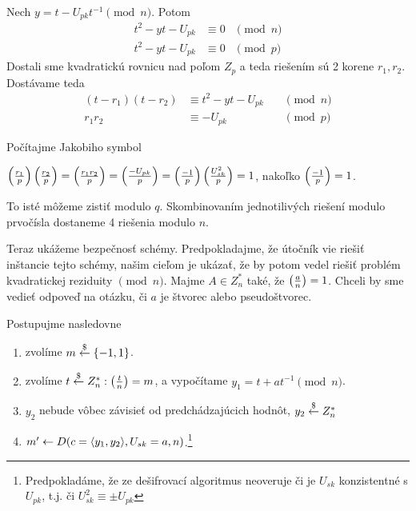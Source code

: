 Nech $y = t - U_{pk} t^{-1} \pmod{n}$.
Potom
\begin{align*}
    t^2 - y t - U_{pk} &\equiv 0 &\pmod{n} \\
   t^2 - y t - U_{pk} &\equiv 0 &\pmod{p}
\end{align*}
Dostali sme kvadratickú rovnicu nad poľom $Z_p$ a teda riešením sú 2 korene
$r_1,r_2$.
Dostávame teda 
\begin{align*}
    (t-r_1)(t-r_2) &\equiv t^2 - y t - U_{pk} \quad&\pmod{n}\\
    r_1 r_2 &\equiv -U_{pk} &\pmod{p}
\end{align*}

Počítajme Jakobiho symbol 

$\left( \frac{r_1}{p} \right) \left( \frac{r_2}{p} \right) = \left( \frac{r_1 r_2}{p} \right) =
\left( \frac{-U_{pk}}{p} \right) = \left( \frac{-1}{p} \right) \left( \frac{U_{sk}^2}{p} \right)=1$, nakoľko
$\left( \frac{-1}{p} \right)=1$.

To isté môžeme zistiť modulo $q$.
Skombinovaním jednotilivých riešení modulo prvočísla dostaneme 4 riešenia
modulo $n$.

Teraz ukážeme bezpečnosť schémy. Predpokladajme, že útočník vie riešiť
inštancie tejto schémy, našim cieľom je ukázať, že by potom vedel
riešiť problém kvadratickej reziduity $\pmod{n}$.
Majme $A \in Z_n^*$ také, že $\left( \frac{a}{n} \right)=1$. Chceli by sme vedieť
odpoveď na otázku, či $a$ je štvorec alebo pseudoštvorec.

Postupujme nasledovne
\begin{enumerate}
    \item zvolíme $m \overset{\$}{\leftarrow} \{-1,1\}$.
    \item zvolíme $t \overset{\$}{\leftarrow} Z_n^*: \left( \frac{t}{n} \right)=m$, a vypočítame
        $y_1 = t + a t^{-1} \pmod{n}$.
    \item $y_2$ nebude vôbec závisieť od predchádzajúcich hodnôt,
            $y_2 \overset{\$}{\leftarrow} Z_n^*$
    \item $m' \leftarrow D(c=\langle y_1, y_2 \rangle, U_{sk}=a,n)
            $.\footnote{Predpokladáme, že ze dešifrovací algoritmus
            neoveruje či je $U_{sk}$ konzistentné s $U_{pk}$, t.j.
            či $U_{sk}^2 \equiv \pm U_{pk}$}
\end{enumerate}
